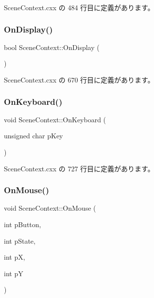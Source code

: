  Scene\+Context.\+cxx の 484 行目に定義があります。

\mbox{\label{class_scene_context_a757f3c7f7824e77bbce4a3baf9490ac6}} 
\subsubsection{\texorpdfstring{On\+Display()}{OnDisplay()}}
{\footnotesize\ttfamily bool Scene\+Context\+::\+On\+Display (\begin{DoxyParamCaption}{ }\end{DoxyParamCaption})}



 Scene\+Context.\+cxx の 670 行目に定義があります。

\mbox{\label{class_scene_context_a0a885b57e382b9e5057b0cae7b96de61}} 
\subsubsection{\texorpdfstring{On\+Keyboard()}{OnKeyboard()}}
{\footnotesize\ttfamily void Scene\+Context\+::\+On\+Keyboard (\begin{DoxyParamCaption}\item[{unsigned char}]{p\+Key }\end{DoxyParamCaption})}



 Scene\+Context.\+cxx の 727 行目に定義があります。

\mbox{\label{class_scene_context_a661e2afdb07136789ca6e63f73a22801}} 
\subsubsection{\texorpdfstring{On\+Mouse()}{OnMouse()}}
{\footnotesize\ttfamily void Scene\+Context\+::\+On\+Mouse (\begin{DoxyParamCaption}\item[{int}]{p\+Button,  }\item[{int}]{p\+State,  }\item[{int}]{pX,  }\item[{int}]{pY }\end{DoxyParamCaption})}



